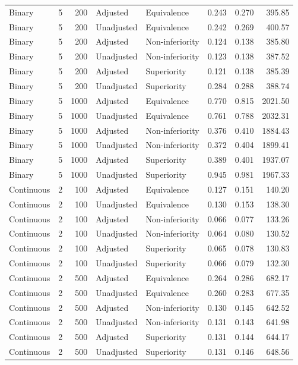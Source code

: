 \documentclass[12pt,a4paper]{article}
\theoremstyle{definition}
\theoremstyle{remark}\newtheorem{remark}{Remark}
\numberwithin{equation}{section}
\begin{document}
\begin{singlespace}
\begin{longtable}{@{}lcrllrrr@{}}
Binary & 5 & 200 & Adjusted & Equivalence & 0.243 & 0.270 & 395.85 \\
Binary & 5 & 200 & Unadjusted & Equivalence & 0.242 & 0.269 & 400.57 \\
Binary & 5 & 200 & Adjusted & Non-inferiority & 0.124 & 0.138 & 385.80 \\
Binary & 5 & 200 & Unadjusted & Non-inferiority & 0.123 & 0.138 & 387.52 \\
Binary & 5 & 200 & Adjusted & Superiority & 0.121 & 0.138 & 385.39 \\
Binary & 5 & 200 & Unadjusted & Superiority & 0.284 & 0.288 & 388.74 \\

Binary & 5 & 1000 & Adjusted & Equivalence & 0.770 & 0.815 & 2021.50 \\
Binary & 5 & 1000 & Unadjusted & Equivalence & 0.761 & 0.788 & 2032.31 \\
Binary & 5 & 1000 & Adjusted & Non-inferiority & 0.376 & 0.410 & 1884.43 \\
Binary & 5 & 1000 & Unadjusted & Non-inferiority & 0.372 & 0.404 & 1899.41 \\
Binary & 5 & 1000 & Adjusted & Superiority & 0.389 & 0.401 & 1937.07 \\
Binary & 5 & 1000 & Unadjusted & Superiority & 0.945 & 0.981 & 1967.33 \\

Continuous & 2 & 100 & Adjusted & Equivalence & 0.127 & 0.151 & 140.20 \\
Continuous & 2 & 100 & Unadjusted & Equivalence & 0.130 & 0.153 & 138.30 \\
Continuous & 2 & 100 & Adjusted & Non-inferiority & 0.066 & 0.077 & 133.26 \\
Continuous & 2 & 100 & Unadjusted & Non-inferiority & 0.064 & 0.080 & 130.52 \\
Continuous & 2 & 100 & Adjusted & Superiority & 0.065 & 0.078 & 130.83 \\
Continuous & 2 & 100 & Unadjusted & Superiority & 0.066 & 0.079 & 132.30 \\

Continuous & 2 & 500 & Adjusted & Equivalence & 0.264 & 0.286 & 682.17 \\
Continuous & 2 & 500 & Unadjusted & Equivalence & 0.260 & 0.283 & 677.35 \\
Continuous & 2 & 500 & Adjusted & Non-inferiority & 0.130 & 0.145 & 642.52 \\
Continuous & 2 & 500 & Unadjusted & Non-inferiority & 0.131 & 0.143 & 641.98 \\
Continuous & 2 & 500 & Adjusted & Superiority & 0.131 & 0.144 & 644.17 \\
Continuous & 2 & 500 & Unadjusted & Superiority & 0.131 & 0.146 & 648.56 \\


\end{longtable}
\end{singlespace}
\end{document}
